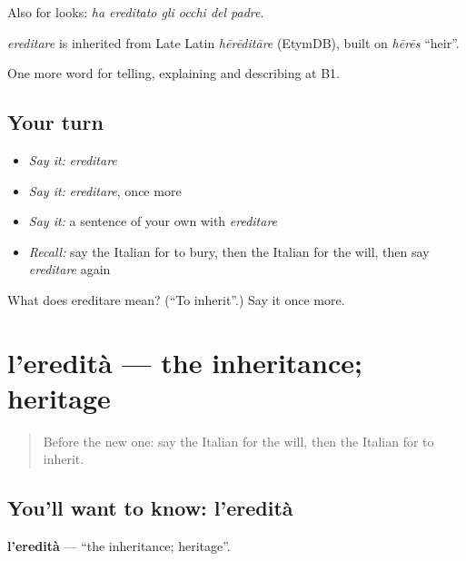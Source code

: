 Also for looks: \emph{ha ereditato gli occhi del padre}.

\begin{cousinweb}
\emph{ereditare} is inherited from Late Latin \emph{hērēditāre} (EtymDB), built on \emph{hērēs} \textquotedblleft{}heir\textquotedblright{}.
\end{cousinweb}

\begin{grammarlens}[title={What you've built}]
One more word for telling, explaining and describing at B1.
\end{grammarlens}

\subsection*{Your turn}
\begin{itemize}
\raggedright
  \item \emph{Say it:} \emph{ereditare}
  \item \emph{Say it:} \emph{ereditare}, once more
  \item \emph{Say it:} a sentence of your own with \emph{ereditare}
  \item \emph{Recall:} say the Italian for to bury, then the Italian for the will, then say \emph{ereditare} again
\end{itemize}

\begin{tcolorbox}[breakable,colback=teal!4,colframe=teal!35!black,title={Before you move on}]
What does ereditare mean? (\textquotedblleft{}To inherit\textquotedblright{}.) Say it once more.
\end{tcolorbox}
\section[l'eredità]{l'eredità — the inheritance; heritage}

\label{lesson:IT-C314-eredita}



\begin{quote}
Before the new one: say the Italian for the will, then the Italian for to inherit.
\end{quote}

\subsection*{You'll want to know: l'eredità}
\textbf{l'eredità} — \textquotedblleft{}the inheritance; heritage\textquotedblright{}.

